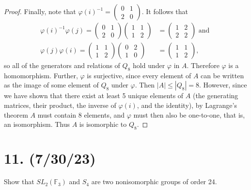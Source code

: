 \documentclass{article}
\begin{document}
\begin{proof}
    Finally, note that $\varphi(i)^{-1} = \begin{pmatrix}0 & 1 \\ 2 & 0\end{pmatrix}$. It follows that
    \begin{align*}
        \varphi(i)^{-1} \varphi(j) = \begin{pmatrix}0 & 1 \\ 2 & 0\end{pmatrix}\begin{pmatrix}1 & 1 \\ 1 & 2\end{pmatrix} &= \begin{pmatrix}1 & 2 \\ 2 & 2\end{pmatrix} \text{ and } \\ 
        \varphi(j)\varphi(i) = \begin{pmatrix}1 & 1 \\ 1 & 2\end{pmatrix}\begin{pmatrix}0 & 2 \\ 1 & 0\end{pmatrix} &= \begin{pmatrix}1 & 1 \\ 1 & 2\end{pmatrix},
    \end{align*}
    so all of the generators and relations of $Q_8$ hold under $\varphi$ in $A$. Therefore $\varphi$ is a homomorphism. Further, $\varphi$ is surjective, since every element of $A$ can be written as the image of some element of $Q_8$ under $\varphi$. Then $|A| \leq |Q_8| = 8$. However, since we have shown that there exist at least 5 unique elements of $A$ (the generating matrices, their product, the inverse of $\varphi(i)$, and the identity), by Lagrange's theorem $A$ must contain 8 elements, and $\varphi$ must then also be one-to-one, that is, an isomorphism. Thus $A$ is isomorphic to $Q_8$.
\end{proof}

\section*{11. (7/30/23)}

Show that $SL_2(\mathbb{F}_3)$ and $S_4$ are two nonisomorphic groups of order 24.
\end{document}
